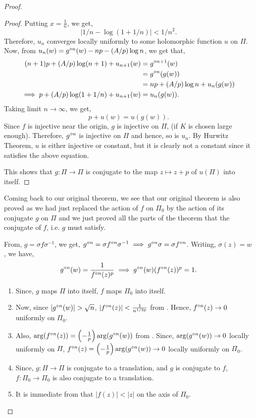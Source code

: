 \begin{proof}
\begin{proof}
Putting \( x=\frac{1}{n} \), we get, \[
	|1 /n-\log (1+ 1 /n)|<1 /n^2
.\] 
Therefore, \( u_n\) converges locally uniformly to some holomorphic function \( u \) on \( \Pi \).\\
Now, from \( u_n(w)=\gog[n](w)-np-(A /p)\log n \), we get that, 
\begin{align*}
	(n+1)p+(A /p)\log (n+1)+u_{n+1}(w)&=\gog[n+1](w)\\
									  &=\gog[n](g(w))\\
									  &=np+(A /p)\log n+u_n(g(w))\\
	\implies p+(A /p)\log (1+1 /n)+u_{n+1}(w)&=u_n(g(w))
.\end{align*}
Taking limit \( n\to \infty \), we get, \[
	p+u(w)=u(g(w))
.\] 
Since \( f \) is injective near the origin, \( g \) is injective on \( \Pi \),
(if \( K \) is chosen large enough). Therefore, \( \gog[n] \) is injective on \( \Pi \)
and hence, so is \( u_n \). By Hurwitz Theorem, \( u \) is either injective or constant, but it
is clearly not a constant since it satisfies the above equation.

This shows that \( g:\Pi\to \Pi \) is conjugate to the map \( z\mapsto z+p \) of \( u(\Pi) \) into
itself.
\end{proof}

Coming back to our original theorem, we see that our original theorem is also 
proved as we had just replaced the action of \( f \) on \( \Pi_0 \) by the action of 
its conjugate \( g \) on \( \Pi \) and we just proved all the parts of the theorem that
the conjugate of \( f \), i.e. \( g \) must satisfy.

From, \( g=\sigma f\sigma^{-1} \), we get,
\( \gog[n]=\sigma \fof[n]\sigma^{-1}\implies\gog[n]\sigma= \sigma\fof[n]\). 
Writing, \( \sigma(z)=w \), we have,
\begin{align}
	\gog[n](w)=\frac{1}{\fof[n](z)^p}\implies\gog[n](w)(\fof[n](z))^p=1\label{eqn8}
.\end{align}
\begin{enumerate}
	\item Since, \( g \) maps \( \Pi \) into itself, \( f \) maps \( \Pi_0 \) into itself.
	\item Now, since \( |\gog[n](w)|>\sqrt{n}  \), \( |\fof[n](z)|<\frac{1}{n^{1/2p}} \) from . Hence, \( \fof[n](z)\to 0 \) uniformly on \( \Pi_0 \).
	\item Also, \( \arg(\fof[n](z))=\left(-\frac{1}{p}\right)\arg(\gog[n](w)) \) from . Since, \( \arg(\gog[n](w))\to 0 \) locally uniformly on \( \Pi \), \( \fof[n](z)=\left(-\frac{1}{p}\right)\arg(\gog[n](w))\to 0 \) locally uniformly on \( \Pi_0 \).
	\item Since, \( g:\Pi\to \Pi \) is conjugate to a translation, and \( g \) is conjugate to \( f \), \( f:\Pi_0\to \Pi_0 \) is also conjugate to a translation.
	\item It is immediate from  that \( |f(z)|<|z| \) on the axis of \( \Pi_0 \).
\end{enumerate}

\end{proof}


